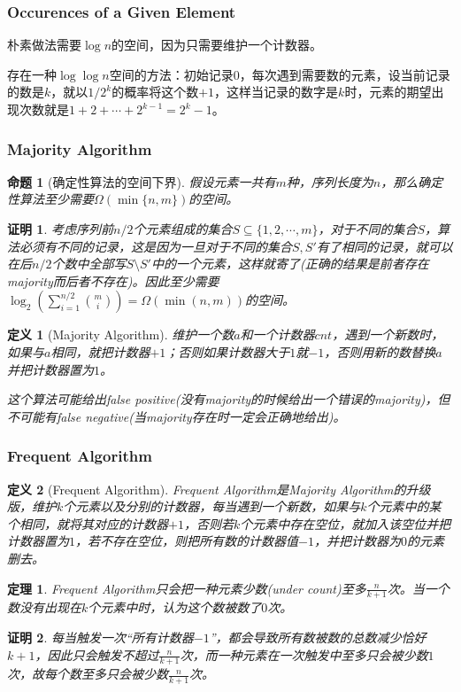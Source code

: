 \documentclass[8pt]{article}
\theoremstyle{compact}
\newtheorem{theorem}{定理}
\newtheorem{definition}{定义}
\newtheorem{proposition}{命题}
\newtheorem{Proof}{证明}
\begin{document}
\subsubsection{Occurences of a Given Element}
朴素做法需要$\log n$的空间，因为只需要维护一个计数器。

存在一种$\log \log n$空间的方法：初始记录$0$，每次遇到需要数的元素，设当前记录的数是$k$，就以$1 / 2^k$的概率将这个数$+1$，这样当记录的数字是$k$时，元素的期望出现次数就是$1 + 2 + \cdots + 2^{k-1} = 2^k-1$。
\subsubsection{Majority Algorithm}
\begin{proposition}[确定性算法的空间下界]
	假设元素一共有$m$种，序列长度为$n$，那么确定性算法至少需要$\Omega(\min\{n, m\})$的空间。
\end{proposition}
\begin{Proof}
	考虑序列前$n/2$个元素组成的集合$S \subseteq \{1, 2, \cdots, m\}$，对于不同的集合$S$，算法必须有不同的记录，这是因为一旦对于不同的集合$S, S'$有了相同的记录，就可以在后$n/2$个数中全部写$S \setminus S'$中的一个元素，这样就寄了(正确的结果是前者存在majority而后者不存在)。因此至少需要$\log_2\left(\sum\limits_{i=1}^{n/2}\binom mi\right) = \Omega(\min(n, m))$的空间。
\end{Proof}
\begin{definition}[Majority Algorithm]
	维护一个数$a$和一个计数器$cnt$，遇到一个新数时，如果与$a$相同，就把计数器$+1$；否则如果计数器大于$1$就$-1$，否则用新的数替换$a$并把计数器置为$1$。
	
	这个算法可能给出false positive(没有majority的时候给出一个错误的majority)，但不可能有false negative(当majority存在时一定会正确地给出)。
\end{definition}
\subsubsection{Frequent Algorithm}
\begin{definition}[Frequent Algorithm]
	Frequent Algorithm是Majority Algorithm的升级版，维护$k$个元素以及分别的计数器，每当遇到一个新数，如果与$k$个元素中的某个相同，就将其对应的计数器$+1$，否则若$k$个元素中存在空位，就加入该空位并把计数器置为$1$，若不存在空位，则把所有数的计数器值$-1$，并把计数器为$0$的元素删去。
\end{definition}
\begin{theorem}
	Frequent Algorithm只会把一种元素少数(under count)至多$\frac{n}{k+1}$次。当一个数没有出现在$k$个元素中时，认为这个数被数了$0$次。
\end{theorem}
\begin{Proof}
	每当触发一次“所有计数器$-1$”，都会导致所有数被数的总数减少恰好$k+1$，因此只会触发不超过$\frac{n}{k+1}$次，而一种元素在一次触发中至多只会被少数$1$次，故每个数至多只会被少数$\frac{n}{k+1}$次。
\end{Proof}
\end{document}
